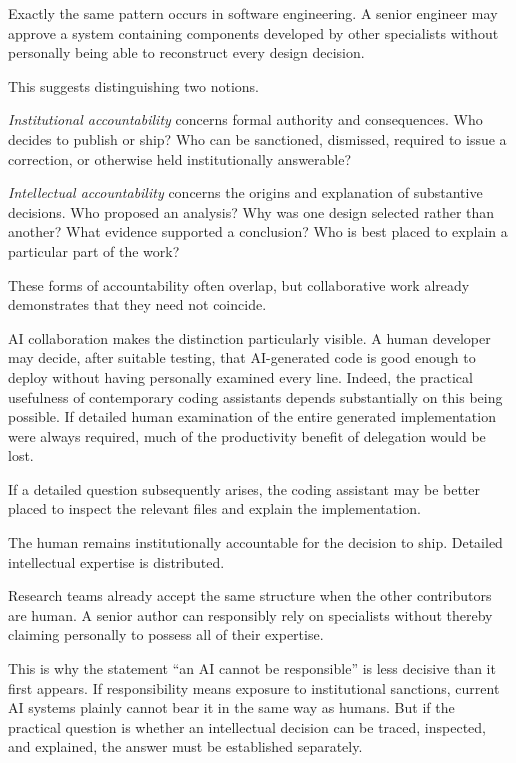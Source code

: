 Exactly the same pattern occurs in software engineering. A senior engineer may approve a system containing components developed by other specialists without personally being able to reconstruct every design decision.

This suggests distinguishing two notions.

\emph{Institutional accountability} concerns formal authority and consequences. Who decides to publish or ship? Who can be sanctioned, dismissed, required to issue a correction, or otherwise held institutionally answerable?

\emph{Intellectual accountability} concerns the origins and explanation of substantive decisions. Who proposed an analysis? Why was one design selected rather than another? What evidence supported a conclusion? Who is best placed to explain a particular part of the work?

These forms of accountability often overlap, but collaborative work already demonstrates that they need not coincide.

AI collaboration makes the distinction particularly visible. A human developer may decide, after suitable testing, that AI-generated code is good enough to deploy without having personally examined every line. Indeed, the practical usefulness of contemporary coding assistants depends substantially on this being possible. If detailed human examination of the entire generated implementation were always required, much of the productivity benefit of delegation would be lost.

If a detailed question subsequently arises, the coding assistant may be better placed to inspect the relevant files and explain the implementation.

The human remains institutionally accountable for the decision to ship. Detailed intellectual expertise is distributed.

Research teams already accept the same structure when the other contributors are human. A senior author can responsibly rely on specialists without thereby claiming personally to possess all of their expertise.

This is why the statement ``an AI cannot be responsible'' is less decisive than it first appears. If responsibility means exposure to institutional sanctions, current AI systems plainly cannot bear it in the same way as humans. But if the practical question is whether an intellectual decision can be traced, inspected, and explained, the answer must be established separately.

